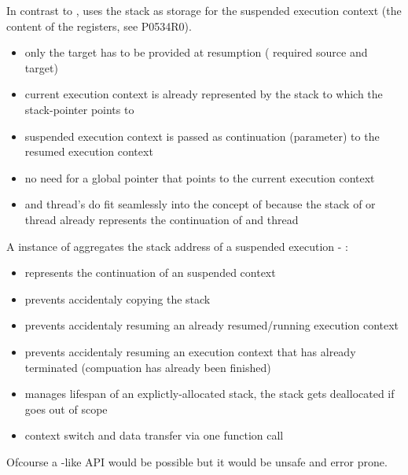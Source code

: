 

In contrast to \uc, \cc uses the stack as storage for the suspended
execution context (the content of the registers, see P0534R0\cite{P0534R0}).

\begin{itemize}
    \item only the target has to be provided at resumption
        ( required source and target)
    \item current execution context is already represented by the
        stack to which the stack-pointer points to
    \item suspended execution context is passed as continuation (parameter) 
        to the resumed execution context
    \item no need for a global pointer that points to the current execution context
    \item \main and thread's \entryfn do fit seamlessly into the concept of \cc
        because the stack of \main or thread already represents the continuation of \main
        and thread
\end{itemize}


A instance of \cont aggregates the stack address of a suspended execution
- \cont:

\begin{itemize}
    \item represents the continuation of an suspended context
    \item prevents accidentaly copying the stack
    \item prevents accidentaly resuming an already resumed/running execution
        context
    \item prevents accidentaly resuming an execution context that has already
        terminated (compuation has already been finished)
    \item manages lifespan of an explictly-allocated stack, the stack gets
        deallocated if \cont goes out of scope
    \item context switch and data transfer via one function call
\end{itemize}

Ofcourse a \uc-like API would be possible but it would be unsafe and error
prone.
